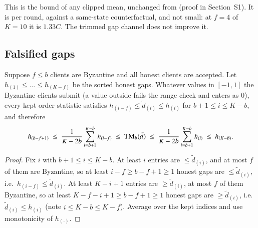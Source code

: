 This is the bound of any clipped mean, unchanged from \clamp{} (proof in Section~S1). It is per round, against a same-state counterfactual, and not small: at $f=4$ of $K=10$ it is $1.33C$. The trimmed gap channel does not improve it.

\subsection{Falsified gaps}

\begin{theorem}\label{thm:falsify}
Suppose $f\le b$ clients are Byzantine and all honest clients are accepted. Let $h_{(1)}\le\dots\le h_{(K-f)}$ be the sorted honest gaps. Whatever values in $[-1,1]$ the Byzantine clients submit (a value outside fails the range check and enters as $0$), every kept order statistic satisfies $h_{(i-f)}\le\tilde d_{(i)}\le h_{(i)}$ for $b+1\le i\le K-b$, and therefore
\begin{equation}\label{eq:t3}
h_{(b-f+1)}\;\le\;\frac{1}{K-2b}\sum_{i=b+1}^{K-b}h_{(i-f)}\;\le\;\mathrm{TM}_b(\tilde d)\;\le\;\frac{1}{K-2b}\sum_{i=b+1}^{K-b}h_{(i)}\;\le\;h_{(K-b)} .
\end{equation}
\end{theorem}

\begin{proof}
Fix $i$ with $b+1\le i\le K-b$. At least $i$ entries are $\le\tilde d_{(i)}$, and at most $f$ of them are Byzantine, so at least $i-f\ge b-f+1\ge1$ honest gaps are $\le\tilde d_{(i)}$, i.e.\ $h_{(i-f)}\le\tilde d_{(i)}$. At least $K-i+1$ entries are $\ge\tilde d_{(i)}$, at most $f$ of them Byzantine, so at least $K-f-i+1\ge b-f+1\ge1$ honest gaps are $\ge\tilde d_{(i)}$, i.e.\ $\tilde d_{(i)}\le h_{(i)}$ (note $i\le K-b\le K-f$). Average over the kept indices and use monotonicity of $h_{(\cdot)}$.
\end{proof}


